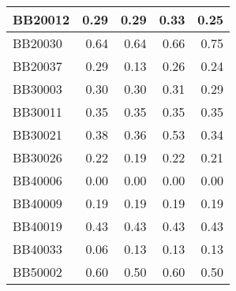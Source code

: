 \begin{table}[htbp]
\begin{tabular}{|l|r|r|r|r|}
		\hline
		BB20012 & \cellcolor[rgb]{ .686,  .871,  .733}0.29 & \cellcolor[rgb]{ .686,  .871,  .733}0.29 & \cellcolor[rgb]{ .988,  1,  .992}0.33 & \cellcolor[rgb]{ .384,  .745,  .478}0.25 \\
		\hline
		BB20030 & \cellcolor[rgb]{ .384,  .745,  .478}0.64 & \cellcolor[rgb]{ .384,  .745,  .478}0.64 & \cellcolor[rgb]{ .502,  .792,  .58}0.66 & \cellcolor[rgb]{ .988,  1,  .992}0.75 \\
		\hline
		BB20037 & \cellcolor[rgb]{ .988,  1,  .992}0.29 & \cellcolor[rgb]{ .384,  .745,  .478}0.13 & \cellcolor[rgb]{ .867,  .949,  .886}0.26 & \cellcolor[rgb]{ .804,  .922,  .835}0.24 \\
		\hline
		BB30003 & \cellcolor[rgb]{ .682,  .871,  .733}0.30 & \cellcolor[rgb]{ .682,  .871,  .733}0.30 & \cellcolor[rgb]{ .988,  1,  .992}0.31 & \cellcolor[rgb]{ .384,  .745,  .478}0.29 \\
		\hline
		BB30011 & \cellcolor[rgb]{ .988,  1,  .992}0.35 & \cellcolor[rgb]{ .988,  1,  .992}0.35 & \cellcolor[rgb]{ .988,  1,  .992}0.35 & \cellcolor[rgb]{ .988,  1,  .992}0.35 \\
		\hline
		BB30021 & \cellcolor[rgb]{ .522,  .804,  .596}0.38 & \cellcolor[rgb]{ .451,  .773,  .537}0.36 & \cellcolor[rgb]{ .988,  1,  .992}0.53 & \cellcolor[rgb]{ .384,  .745,  .478}0.34 \\
		\hline
		BB30026 & \cellcolor[rgb]{ .988,  1,  .992}0.22 & \cellcolor[rgb]{ .384,  .745,  .478}0.19 & \cellcolor[rgb]{ .988,  1,  .992}0.22 & \cellcolor[rgb]{ .682,  .871,  .733}0.21 \\
		\hline
		BB40006 & \cellcolor[rgb]{ .988,  1,  .992}0.00 & \cellcolor[rgb]{ .988,  1,  .992}0.00 & \cellcolor[rgb]{ .988,  1,  .992}0.00 & \cellcolor[rgb]{ .988,  1,  .992}0.00 \\
		\hline
		BB40009 & \cellcolor[rgb]{ .988,  1,  .992}0.19 & \cellcolor[rgb]{ .988,  1,  .992}0.19 & \cellcolor[rgb]{ .988,  1,  .992}0.19 & \cellcolor[rgb]{ .988,  1,  .992}0.19 \\
		\hline
		BB40019 & \cellcolor[rgb]{ .988,  1,  .992}0.43 & \cellcolor[rgb]{ .988,  1,  .992}0.43 & \cellcolor[rgb]{ .988,  1,  .992}0.43 & \cellcolor[rgb]{ .988,  1,  .992}0.43 \\
		\hline
		BB40033 & \cellcolor[rgb]{ .384,  .745,  .478}0.06 & \cellcolor[rgb]{ .988,  1,  .992}0.13 & \cellcolor[rgb]{ .988,  1,  .992}0.13 & \cellcolor[rgb]{ .988,  1,  .992}0.13 \\
		\hline
		BB50002 & \cellcolor[rgb]{ .988,  1,  .992}0.60 & \cellcolor[rgb]{ .384,  .745,  .478}0.50 & \cellcolor[rgb]{ .988,  1,  .992}0.60 & \cellcolor[rgb]{ .384,  .745,  .478}0.50 \\

\end{tabular}
\end{table}
